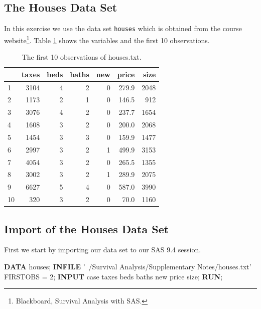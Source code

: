 \documentclass[a4paper,oneside]{memoir}
\newenvironment{Shaded}{\begin{snugshade}}{\end{snugshade}}
\newcommand{\DecValTok}[1]{\textcolor[rgb]{0.00,0.00,0.81}{#1}}
\newcommand{\KeywordTok}[1]{\textcolor[rgb]{0.13,0.29,0.53}{\textbf{#1}}}
\newcommand{\NormalTok}[1]{#1}
\newcommand{\StringTok}[1]{\textcolor[rgb]{0.31,0.60,0.02}{#1}}
\let\rmarkdownfootnote\footnote%
\def\footnote{\protect\rmarkdownfootnote}
\begin{document}
\hypertarget{the-houses-data-set}{%
\subsection{The Houses Data Set}\label{the-houses-data-set}}

In this exercise we use the data set \texttt{houses} which is obtained from the course website\footnote{Blackboard, Survival Analysis with SAS.}. Table \ref{tab:houses} shows the variables and the first 10 observations.

\begin{table}[!h]

\caption{\label{tab:houses}The first 10 observations of houses.txt.}
\centering
\begin{tabular}{lrrrrrr}
\toprule
  & taxes & beds & baths & new & price & size\\
\midrule
\rowcolor{gray!6}  1 & 3104 & 4 & 2 & 0 & 279.9 & 2048\\
2 & 1173 & 2 & 1 & 0 & 146.5 & 912\\
\rowcolor{gray!6}  3 & 3076 & 4 & 2 & 0 & 237.7 & 1654\\
4 & 1608 & 3 & 2 & 0 & 200.0 & 2068\\
\rowcolor{gray!6}  5 & 1454 & 3 & 3 & 0 & 159.9 & 1477\\
6 & 2997 & 3 & 2 & 1 & 499.9 & 3153\\
\rowcolor{gray!6}  7 & 4054 & 3 & 2 & 0 & 265.5 & 1355\\
8 & 3002 & 3 & 2 & 1 & 289.9 & 2075\\
\rowcolor{gray!6}  9 & 6627 & 5 & 4 & 0 & 587.0 & 3990\\
10 & 320 & 3 & 2 & 0 & 70.0 & 1160\\
\bottomrule
\end{tabular}
\end{table}

\hypertarget{import-of-the-houses-data-set}{%
\subsection{Import of the Houses Data Set}\label{import-of-the-houses-data-set}}

First we start by importing our data set to our SAS 9.4 session.

\begin{Shaded}
\begin{Highlighting}[]
\KeywordTok{DATA}\NormalTok{ houses;}
  \KeywordTok{INFILE} \StringTok{'~/Survival Analysis/Supplementary Notes/houses.txt'} 
\NormalTok{   FIRSTOBS = }\DecValTok{2}\NormalTok{;}
  \KeywordTok{INPUT}\NormalTok{ case taxes beds baths new price size;}
\KeywordTok{RUN}\NormalTok{;}
\end{Highlighting}
\end{Shaded}
\end{document}

